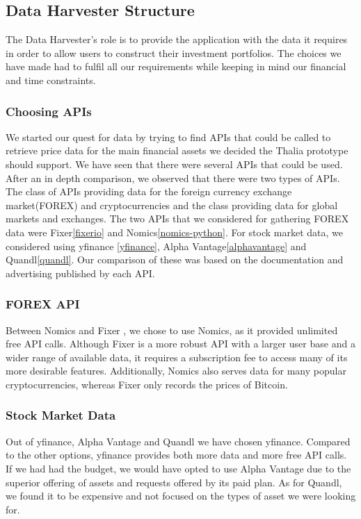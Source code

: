 \documentclass[main.tex]{subfiles}
\begin{document}
\subsection{Data Harvester Structure}

The Data Harvester's role is to provide the application with the data it requires in order to allow users to construct their investment portfolios. The choices we have made had to fulfil all our requirements while keeping in mind our financial and time constraints.

\subsubsection{Choosing APIs}
We started our quest for data by trying to find APIs that could be called to retrieve price data for the main financial assets we decided the Thalia prototype should support.
We have seen that there were several APIs that could be used. After an in depth comparison, we observed that there were two types of APIs. The class of APIs providing data for the foreign currency exchange market(FOREX) and cryptocurrencies and the class providing data for global markets and exchanges. The two APIs that we considered for gathering FOREX data were Fixer\ref{fixerio} and Nomics\ref{nomics-python}. For stock market data, we considered using yfinance \ref{yfinance}, Alpha Vantage\ref{alphavantage} and Quandl\ref{quandl}. Our comparison of these was based on the documentation and advertising published by each API.\newline


\subsubsection*{FOREX API}
Between Nomics and Fixer \cite{fixerio}, we chose to use Nomics, as it provided unlimited free API calls. Although Fixer is a more robust API with a larger user base and a wider range of available data, it requires a subscription fee to access many of its more desirable features. Additionally, Nomics also serves data for many popular cryptocurrencies, whereas Fixer only records the prices of Bitcoin.  \newline

\subsubsection*{Stock Market Data}
Out of yfinance, Alpha Vantage \cite{alphavantage}and Quandl we have chosen yfinance. Compared to the other options, yfinance provides both more data and more free API calls. If we had had the budget, we would have opted to use Alpha Vantage due to the superior offering of assets and requests offered by its paid plan. As for Quandl, we found it to be expensive and not focused on the types of asset we were looking for. 
\end{document}
